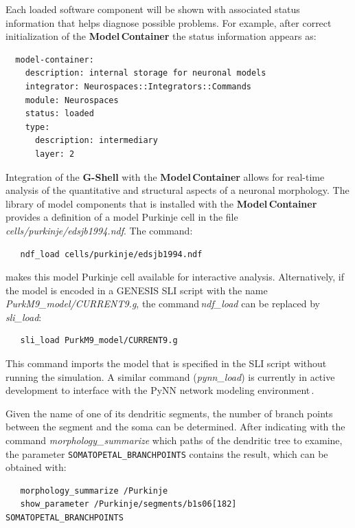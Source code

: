 \documentclass[10pt]{article}
\begin{document}
Each loaded software component will be shown with associated status
information that helps diagnose possible problems.  For
example, after correct initialization of the {\bf Model\,Container} the
status information appears as:

\begin{verbatim}
  model-container:
    description: internal storage for neuronal models
    integrator: Neurospaces::Integrators::Commands
    module: Neurospaces
    status: loaded
    type:
      description: intermediary
      layer: 2
\end{verbatim}

Integration of the {\bf G-Shell} with the {\bf Model\,Container}
allows for real-time analysis of the quantitative and structural
aspects of a neuronal morphology.  The library of model components
that is installed with the {\bf Model\,Container} provides a
definition of a model Purkinje cell in the file\,{\it
  cells/purkinje/edsjb1994.ndf}.  The command:
\begin{verbatim}
   ndf_load cells/purkinje/edsjb1994.ndf
\end{verbatim}
makes this model Purkinje cell available for interactive analysis.
Alternatively, if the model is encoded in a GENESIS SLI script with the
name\,{\it PurkM9\_model/CURRENT9.g}, the command\,{\it ndf\_load} can be
replaced by\,{\it sli\_load}:

\begin{verbatim}
   sli_load PurkM9_model/CURRENT9.g
\end{verbatim}

This command imports the model that is specified in the SLI script
without running the simulation.  A similar command ({\it pynn\_load})
is currently in active development to interface with the PyNN network modeling
environment\,\cite{davison08:_pynn}.

Given the name of one of its dendritic segments, the number of branch
points between the segment and the soma can be determined. After
indicating with the command {\it morphology\_summarize} which paths of the dendritic tree to examine, the
parameter {\tt SOMATOPETAL\_BRANCHPOINTS} contains the result, which
can be obtained with:

\begin{verbatim}
   morphology_summarize /Purkinje
   show_parameter /Purkinje/segments/b1s06[182] SOMATOPETAL_BRANCHPOINTS
\end{verbatim}
\end{document}
